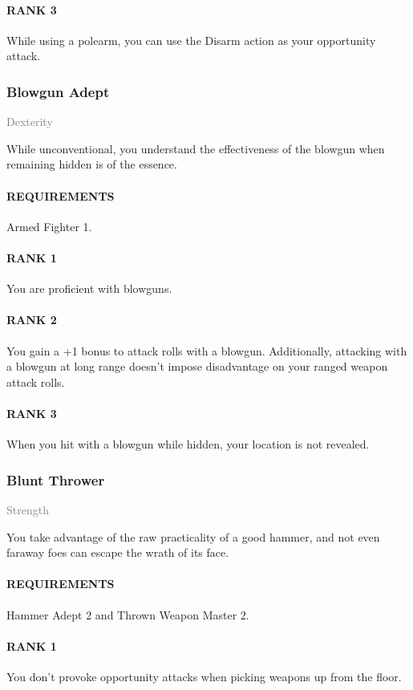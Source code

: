 \paragraph{RANK 3} While using a polearm, you can use the Disarm action as your opportunity attack.

\subsubsection{Blowgun Adept} \label{feat::blowgunadept}
\small{\textcolor{gray}{Dexterity}}

\normalsize
While unconventional, you understand the effectiveness of the blowgun when remaining hidden is of the essence.
\paragraph{REQUIREMENTS} Armed Fighter 1.
\paragraph{RANK 1} You are proficient with blowguns.
\paragraph{RANK 2} You gain a +1 bonus to attack rolls with a blowgun.
Additionally, attacking with a blowgun at long range doesn't impose disadvantage on your ranged weapon attack rolls.
\paragraph{RANK 3} When you hit with a blowgun while hidden, your location is not revealed.

\subsubsection{Blunt Thrower} \label{feat::bluntthrower}
\small{\textcolor{gray}{Strength}}

\normalsize
You take advantage of the raw practicality of a good hammer, and not even faraway foes can escape the wrath of its face.
\paragraph{REQUIREMENTS} Hammer Adept 2 and Thrown Weapon Master 2.
\paragraph{RANK 1} You don't provoke opportunity attacks when picking weapons up from the floor.
